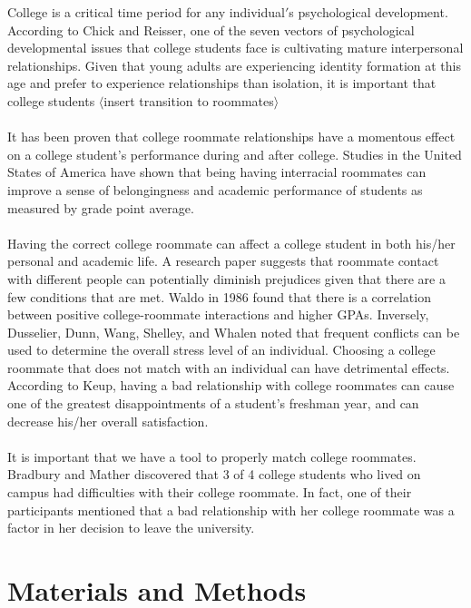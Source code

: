 \documentclass[journal]{./IEEE/IEEEtran}
\begin{document}
    College is a critical time period for any individual$'$s psychological development\cite{erb}. According to Chick and Reisser, one of the seven vectors of psychological developmental issues that college students face is cultivating mature interpersonal relationships\cite{chickering}. Given that young adults are experiencing identity formation at this age and prefer to experience relationships than isolation, it is important that college students $\langle$insert transition to roommates$\rangle$
    \\
    \\
    It has been proven that college roommate relationships have a momentous effect on a college student’s performance during and after college. Studies in the United States of America have shown that being having interracial roommates can improve a sense of belongingness and academic performance of students as measured by grade point average\cite{shook}.
    \\
    \\
    Having the correct college roommate can affect a college student in both his/her personal and academic life. A research paper suggests that roommate contact with different people can potentially diminish prejudices given that there are a few conditions that are met. Waldo in 1986 found that there is a correlation between positive college-roommate interactions and higher GPAs. Inversely, Dusselier, Dunn, Wang, Shelley, and Whalen noted that frequent conflicts can be used to determine the overall stress level of an individual\cite{dusselier}. Choosing a college roommate that does not match with an individual can have detrimental effects. According to Keup, having a bad relationship with college roommates can cause one of the greatest disappointments of a student’s freshman year, and can decrease his/her overall satisfaction\cite{keup}.
    \\
    \\
    It is important that we have a tool to properly match college roommates. Bradbury and Mather discovered that 3 of 4 college students who lived on campus had difficulties with their college roommate. In fact, one of their participants mentioned that a bad relationship with her college roommate was a factor in her decision
    to leave the university\cite{bradbury}.

\section{Materials and Methods}
\end{document}
